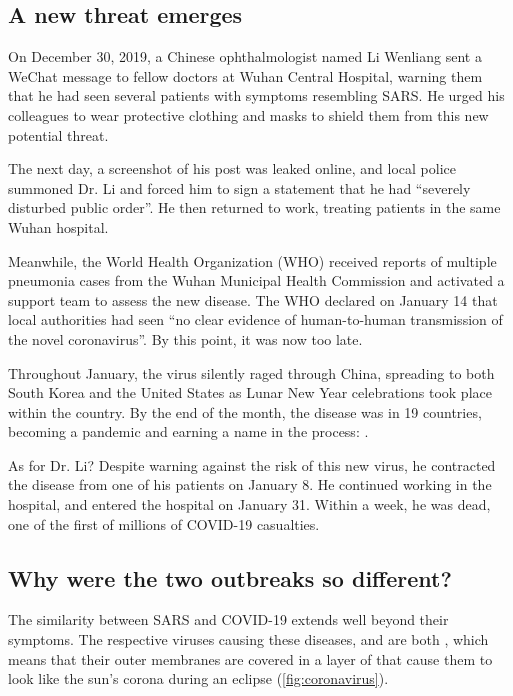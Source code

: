 \FloatBarrier
{}
\subsection{A new threat emerges}

On December 30, 2019, a Chinese ophthalmologist named Li Wenliang sent a WeChat message to fellow doctors at Wuhan Central Hospital, warning them that he had seen several patients with symptoms resembling SARS. He urged his colleagues to wear protective clothing and masks to shield them from this new potential threat.

The next day, a screenshot of his post was leaked online, and local police summoned Dr. Li and forced him to sign a statement that he had ``severely disturbed public order''. He then returned to work, treating patients in the same Wuhan hospital.

Meanwhile, the World Health Organization (WHO) received reports of multiple pneumonia cases from the Wuhan Municipal Health Commission and activated a support team to assess the new disease. The WHO declared on January 14 that local authorities had seen ``no clear evidence of human-to-human transmission of the novel coronavirus''. By this point, it was now too late.

Throughout January, the virus silently raged through China, spreading to both South Korea and the United States as Lunar New Year celebrations took place within the country. By the end of the month, the disease was in 19 countries, becoming a pandemic and earning a name in the process: .

As for Dr. Li? Despite warning against the risk of this new virus, he contracted the disease from one of his patients on January 8. He continued working in the hospital, and entered the hospital on January 31. Within a week, he was dead, one of the first of millions of COVID-19 casualties.

\FloatBarrier
{}
\subsection{Why were the two outbreaks so different?}

The similarity between SARS and COVID-19 extends well beyond their symptoms. The respective viruses causing these diseases,  and  are both , which means that their outer membranes are covered in a layer of  that cause them to look like the sun's corona during an eclipse (\autoref{fig:coronavirus}).\\

